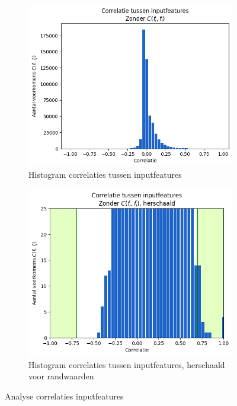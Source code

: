\begin{figure}[H]
    \begin{subfigure}{.5\textwidth}
        \centering
        \includegraphics[width=1\linewidth]{fig/chapt4/NLP/correlaties_input.png}
        \caption{Histogram correlaties tussen inputfeatures}
        \label{fig:chapt4_correlaties_input}
    \end{subfigure}
    \begin{subfigure}{.5\textwidth}
        \centering
        \includegraphics[width=1\linewidth]{fig/chapt4/NLP/correlaties_input_herschaald.png}
        \caption{Histogram correlaties tussen inputfeatures, herschaald voor randwaarden}
        \label{fig:correlaties_input_herschaald}
    \end{subfigure}
    \caption{Analyse correlaties inputfeatures}
    \label{fig:chapt4_correlaties_combined}
\end{figure}

